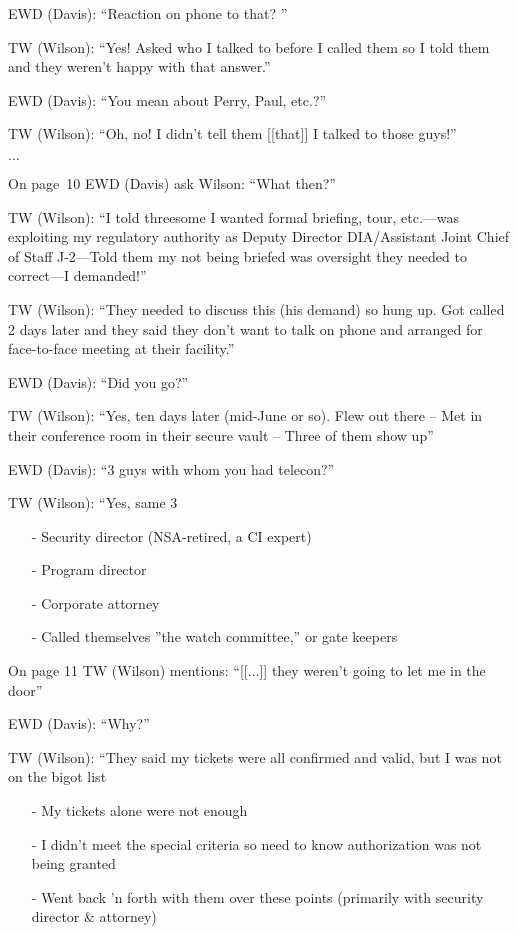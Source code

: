 \begin{svgraybox}
\noindent EWD (Davis): ``Reaction on phone to that? ''

\noindent TW (Wilson): ``Yes! Asked who I talked to before I called them so I told them and they weren't happy with that answer.''

\noindent EWD (Davis): ``You mean about Perry, Paul, etc.?''

\noindent TW (Wilson): ``Oh, no! I didn't tell them [[that]] I talked to those guys!''

$\ldots$

On page~10 EWD (Davis) ask Wilson: ``What then?''

\noindent TW (Wilson): ``I told threesome I wanted formal briefing, tour, etc.---was exploiting my regulatory
authority as Deputy Director DIA/Assistant Joint Chief of Staff J-2---Told them my not
being briefed was oversight they needed to correct---I demanded!''

\noindent TW (Wilson): ``They needed to discuss this (his demand) so hung up. Got called 2 days later and
they said they don't want to talk on phone and arranged for face-to-face meeting at their  facility.''

\noindent EWD (Davis): ``Did you go?''

\noindent TW (Wilson): ``Yes, ten days later (mid-June or so). Flew out there -- Met in their conference room in their secure vault -- Three of them show up''

\noindent EWD (Davis): ``3 guys with whom you had telecon?''

\noindent TW (Wilson): ``Yes, same 3
\begin{enumerate}
\item[-]
Security director (NSA-retired, a CI expert)
\item[-]
Program director
\item[-]
Corporate attorney
\item[-]
Called themselves ''the watch committee,'' or gate keepers
\end{enumerate}

On page 11 TW (Wilson) mentions: ``[[$\ldots$]] they weren't going to let me in the door''

\noindent EWD (Davis): ``Why?''

\noindent TW (Wilson): ``They said my tickets were all confirmed and valid, but I was not on the bigot list
\begin{enumerate}
\item[-]
My tickets alone were not enough
\item[-]
I didn't meet the special criteria so need to know authorization was not being granted
\item[-] Went back 'n forth with them over these points (primarily with security director {\&} attorney)
\end{enumerate}


\end{svgraybox}
